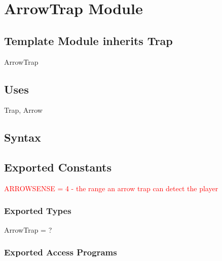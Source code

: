 \documentclass[12pt]{article}
\begin{document}


\newpage

\section*{ArrowTrap Module}

\subsection*{Template Module inherits Trap}

ArrowTrap

\subsection*{Uses}

Trap, Arrow

\subsection*{Syntax}

\subsection*{Exported Constants}

\textcolor{red}{ARROWSENSE = 4 - the range an arrow trap can detect the player}

\subsubsection*{Exported Types}

ArrowTrap = ?

\subsubsection*{Exported Access Programs}
\end{document}
